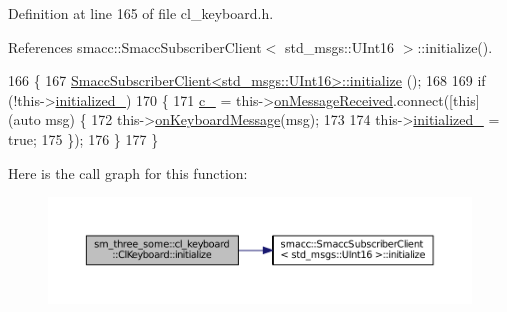 Definition at line 165 of file cl\+\_\+keyboard.\+h.



References smacc\+::\+Smacc\+Subscriber\+Client$<$ std\+\_\+msgs\+::\+U\+Int16 $>$\+::initialize().


\begin{DoxyCode}
166         \{
167                 \hyperlink{classsmacc_1_1SmaccSubscriberClient_acfa97685ecc588fe61eb57002354b58a}{SmaccSubscriberClient<std\_msgs::UInt16>::initialize}
      ();
168 
169                 \textcolor{keywordflow}{if} (!this->\hyperlink{classsm__three__some_1_1cl__keyboard_1_1ClKeyboard_a4d0fead601bf70c79b6fc4b8688d5d18}{initialized\_})
170                 \{
171                         \hyperlink{classsm__three__some_1_1cl__keyboard_1_1ClKeyboard_ab56d189c1d117cc0d3d57595b9bf76a9}{c\_} = this->\hyperlink{classsmacc_1_1SmaccSubscriberClient_a7635fbb013c6fdbc3998da11b44766bb}{onMessageReceived}.connect([\textcolor{keyword}{this}](\textcolor{keyword}{auto} msg) \{
172                                 this->\hyperlink{classsm__three__some_1_1cl__keyboard_1_1ClKeyboard_ac566f6a2d2b2384516ffd8517f57ecfd}{onKeyboardMessage}(msg);
173 
174                                 this->\hyperlink{classsm__three__some_1_1cl__keyboard_1_1ClKeyboard_a4d0fead601bf70c79b6fc4b8688d5d18}{initialized\_} = \textcolor{keyword}{true};
175                         \});
176                 \}
177         \}
\end{DoxyCode}


Here is the call graph for this function\+:
\nopagebreak
\begin{figure}[H]
\begin{center}
\leavevmode
\includegraphics[width=350pt]{classsm__three__some_1_1cl__keyboard_1_1ClKeyboard_a79b6572562326dd94e9546b492d82fbb_cgraph}
\end{center}
\end{figure}


